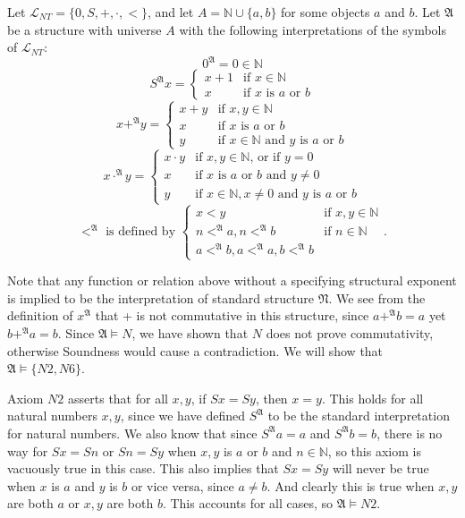 \documentclass[11pt]{hmcpset}
\newenvironment{problem1}[1]{\noindent {\bf Problem #1}}
{\medskip}
\begin{document}
\begin{problem1}{1} Let $\mathcal{L}_{NT}=\{0,S,+,\cdot,<\}$, and let $A=\mathbb{N}\cup\{a,b\}$ for some objects $a$ and $b$. Let $\mathfrak{A}$ be a structure with universe $A$ with the following interpretations of the symbols of  $\mathcal{L}_{NT}$:
$$0^\mathfrak{A}=0\in\mathbb{N}$$ $$S^\mathfrak{A}x=\begin{cases}x+1 & \text{if $x\in\mathbb{N}$}\\x & \text{if $x$ is $a$ or $b$}\end{cases}$$ $$x+^\mathfrak{A}y=\begin{cases}x+y & \text{if $x,y\in\mathbb{N}$}\\x & \text{if $x$ is $a$ or $b$}\\y & \text{if $x\in\mathbb{N}$ and $y$ is $a$ or $b$}\end{cases}$$ $$x\cdot^\mathfrak{A}y=\begin{cases}x\cdot y &\text{if $x,y\in\mathbb{N}$, or if $y=0$}\\x & \text{if $x$ is $a$ or $b$ and $y\ne 0$}\\y & \text{if $x\in\mathbb{N}, x\ne 0$ and $y$ is $a$ or $b$}\end{cases}$$ $$<^\mathfrak{A}\text{ is defined by }\begin{cases}x<y & \text{if $x,y\in\mathbb{N}$}\\n<^\mathfrak{A}a, n<^\mathfrak{A}b & \text{if $n\in\mathbb{N}$}\\a<^\mathfrak{A}b, a<^\mathfrak{A}a, b<^\mathfrak{A}b\end{cases}.$$

Note that any function or relation above without a specifying structural exponent is implied to be the interpretation of standard structure $\mathfrak{N}$. We see from the definition of $x^\mathfrak{A}$ that + is not commutative in this structure, since $a+^\mathfrak{A}b=a$ yet $b+^\mathfrak{A}a=b$. Since $\mathfrak{A}\vDash N$, we have shown that $N$ does not prove commutativity, otherwise Soundness would cause a contradiction. We will show that $\mathfrak{A}\vDash\{N2, N6\}$.

Axiom $N2$ asserts that for all $x,y$, if $Sx=Sy$, then $x=y$. This holds for all natural numbers $x,y$, since we have defined $S^\mathfrak{A}$ to be the standard interpretation for natural numbers. We also know that since $S^\mathfrak{A}a=a$ and $S^\mathfrak{A}b=b$, there is no way for $Sx=Sn$ or $Sn=Sy$ when $x,y$ is $a$ or $b$ and $n\in\mathbb{N}$, so this axiom is vacuously true in this case. This also implies that $Sx=Sy$ will never be true when $x$ is $a$ and $y$ is $b$ or vice versa, since $a\ne b$. And clearly this is true when $x,y$ are both $a$ or $x,y$ are both $b$. This accounts for all cases, so $\mathfrak{A}\vDash N2$. 


\end{problem1}
\end{document}

